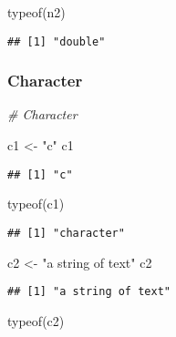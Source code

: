 \documentclass[
]{article}
\newenvironment{Shaded}{\begin{snugshade}}{\end{snugshade}}
\newcommand{\CommentTok}[1]{\textcolor[rgb]{0.56,0.35,0.01}{\textit{#1}}}
\newcommand{\FunctionTok}[1]{\textcolor[rgb]{0.00,0.00,0.00}{#1}}
\newcommand{\NormalTok}[1]{#1}
\newcommand{\OtherTok}[1]{\textcolor[rgb]{0.56,0.35,0.01}{#1}}
\newcommand{\StringTok}[1]{\textcolor[rgb]{0.31,0.60,0.02}{#1}}
\begin{document}
\begin{Shaded}
\begin{Highlighting}[]
\FunctionTok{typeof}\NormalTok{(n2)}
\end{Highlighting}
\end{Shaded}

\begin{verbatim}
## [1] "double"
\end{verbatim}

\hypertarget{character}{%
\subsubsection{Character}\label{character}}

\begin{Shaded}
\begin{Highlighting}[]
\CommentTok{\# Character}

\NormalTok{c1 }\OtherTok{\textless{}{-}} \StringTok{"c"}
\NormalTok{c1}
\end{Highlighting}
\end{Shaded}

\begin{verbatim}
## [1] "c"
\end{verbatim}

\begin{Shaded}
\begin{Highlighting}[]
\FunctionTok{typeof}\NormalTok{(c1)}
\end{Highlighting}
\end{Shaded}

\begin{verbatim}
## [1] "character"
\end{verbatim}

\begin{Shaded}
\begin{Highlighting}[]
\NormalTok{c2 }\OtherTok{\textless{}{-}} \StringTok{"a string of text"}
\NormalTok{c2}
\end{Highlighting}
\end{Shaded}

\begin{verbatim}
## [1] "a string of text"
\end{verbatim}

\begin{Shaded}
\begin{Highlighting}[]
\FunctionTok{typeof}\NormalTok{(c2)}
\end{Highlighting}
\end{Shaded}
\end{document}
